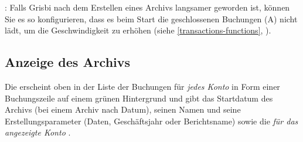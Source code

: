 \Note{}: Falls Grisbi nach dem Erstellen eines Archivs langsamer geworden ist, können Sie es so konfigurieren, dass es beim Start die geschlossenen Buchungen (A) nicht lädt, um die Geschwindigkeit zu erhöhen (siehe \ref{transactions-functions}, ).

\subsection{Anzeige des Archivs\label{datamanagement-archive-display}}

Die  erscheint oben in der Liste der Buchungen für \emph{jedes Konto} in Form einer Buchungszeile auf einem {\setlength{\fboxsep}{2pt}\colorbox[RGB]{60,120,40}{grünen Hintergrund}} und gibt das Startdatum des Archivs (bei einem Archiv nach Datum), seinen Namen und seine Erstellungsparameter (Daten, Geschäftsjahr oder Berichtsname) sowie die  \emph{für das angezeigte Konto} .

